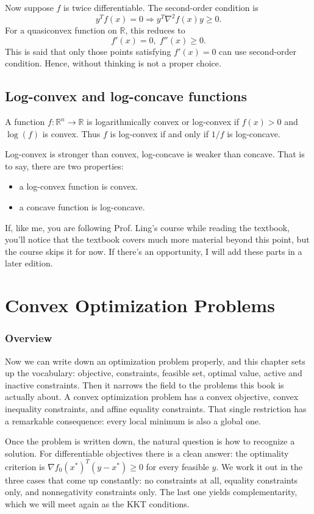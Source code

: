 \documentclass[lang=en,color=blue,mode=fancy,titlestyle=hang]{elegantbook}
\begin{document}
Now suppose $f$ is twice differentiable. The second-order condition is
\[
y^T f(x) = 0 \Rightarrow y^T \nabla^2 f(x) y \geq 0.
\]
For a quasiconvex function on $\mathbb{R}$, this reduces to
\[
f'(x) = 0, \; f''(x) \geq 0.
\]
This is said that only those points satisfying $f'(x) = 0$ can use second-order condition.
Hence, without thinking is not a proper choice.

\section{Log-convex and log-concave functions}
A function $f: \mathbb{R}^n \rightarrow \mathbb{R}$ is logarithmically convex or log-convex
if $f(x) > 0$ and $\log(f)$ is convex. Thus $f$ is log-convex if and only if $1/f$ is
log-concave.

Log-convex is stronger than convex, log-concave is weaker than concave. That is to say,
there are two properties:
\begin{itemize}
  \item a log-convex function is convex.
  \item a concave function is log-concave.
\end{itemize}

If, like me, you are following Prof. Ling's course while reading the textbook,
you'll notice that the textbook covers much more material beyond this point, but the
course skips it for now. If there's an opportunity, I will add these parts in a later
edition.

\chapter{Convex Optimization Problems}

\subsection*{Overview}

Now we can write down an optimization problem properly, and this chapter sets up the
vocabulary: objective, constraints, feasible set, optimal value, active and inactive
constraints. Then it narrows the field to the problems this book is actually about. A
convex optimization problem has a convex objective, convex inequality constraints, and
affine equality constraints. That single restriction has a remarkable consequence: every
local minimum is also a global one.

Once the problem is written down, the natural question is how to recognize a solution. For
differentiable objectives there is a clean answer: the optimality criterion is
$\nabla f_0(x^*)^T (y - x^*) \geq 0$ for every feasible $y$. We work it out in the three
cases that come up constantly: no constraints at all, equality constraints only, and
nonnegativity constraints only. The last one yields complementarity, which we will meet
again as the KKT conditions.
\end{document}
